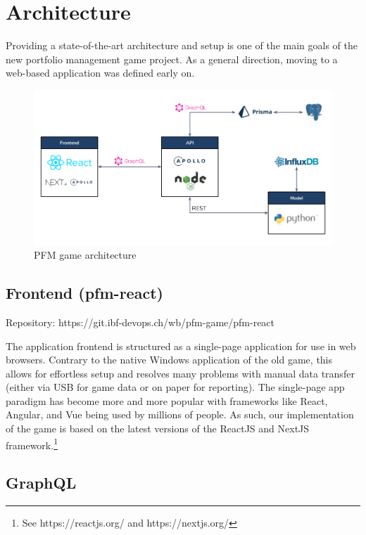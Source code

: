 \section{Architecture}
\label{sec:architecture}

Providing a state-of-the-art architecture and setup is one of the main goals of the new portfolio management game project. As a general direction, moving to a web-based application was defined early on.

\begin{figure}[h!]
  \centering
  \includegraphics[scale=0.45]{img/architecture.png}
  \caption{PFM game architecture}
\end{figure}


\subsection{Frontend (pfm-react)}

Repository: https://git.ibf-devops.ch/wb/pfm-game/pfm-react

The application frontend is structured as a single-page application for use in web browsers. Contrary to the native Windows application of the old game, this allows for effortless setup and resolves many problems with manual data transfer (either via USB for game data or on paper for reporting). The single-page app paradigm has become more and more popular with frameworks like React, Angular, and Vue being used by millions of people. As such, our implementation of the game is based on the latest versions of the ReactJS and NextJS framework.\footnote{See https://reactjs.org/ and https://nextjs.org/}


\subsection{GraphQL}

